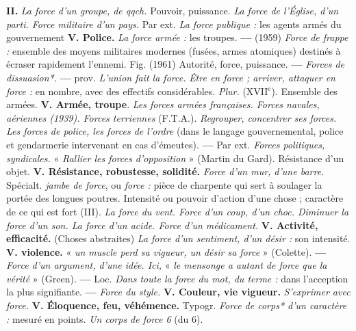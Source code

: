 {\bf II.} {\it La force d'un groupe, de qqch.}  Pouvoir, puissance. {\it La force de l'Église, d'un parti. Force militaire d'un pays.} Par ext. {\it La force publique :} les agents armés du gouvernement {\bf V. Police.} {\it La force armée :} les troupes. {\bf —} (1959) {\it Force de frappe :} ensemble des moyens militaires modernes (fusées, armes atomiques) destinés à écraser rapidement l'ennemi. Fig. (1961) Autorité, force, puissance. {\bf —} {\it Forces de dissuasion*. } {\bf —} {\sc prov.} {\it L'union fait la force.}  {\it Être en force ; arriver, attaquer en force :} en nombre, avec des effectifs considérables.  {\it Plur.} ({\footnotesize XVII}$^\text{e}$). Ensemble des armées. {\bf V. Armée, troupe}. {\it Les forces armées françaises. Forces navales, aériennes (1939). Forces terriennes} (F.T.A.). {\it Regrouper, concentrer ses forces. Les forces de police, les forces de l'ordre} (dans le langage gouvernemental, police et gendarmerie intervenant en cas d'émeutes). {\bf —} Par ext. {\it Forces politiques, syndicales.} « {\it Rallier les forces d'opposition} » ({\sc Martin du Gard}).  Résistance d'un objet. {\bf V. Résistance, robustesse, solidité.} {\it Force d'un mur, d'une barre.} Spécialt. {\it jambe de force}, ou {\it force :} pièce de charpente qui sert à soulager la portée des longues poutres.  Intensité ou pouvoir d'action d'une chose ; caractère de ce qui est fort (III). {\it La force du vent. Force d'un coup, d'un choc. Diminuer la force d'un son. La force d'un acide. Force d'un médicament.} {\bf V. Activité, efficacité.} \lb (Choses abstraites) {\it La force d'un sentiment, d'un désir :} son intensité.  {\bf V. violence.} « {\it un muscle perd sa vigueur, un désir sa force} » ({\sc Colette}). {\bf —} {\it Force d'un argument, d'une idée. Ici,} « {\it le mensonge a autant de force que la vérité} » ({\sc Green}). {\bf —} Loc. {\it Dans toute la force du mot, du terme :} dans l'acception la plus signifiante. {\bf —} {\it Force du style.} {\bf V. Couleur, vie vigueur.} {\it S'exprimer avec force.} {\bf V. Éloquence, feu, véhémence.}  Typogr. {\it Force de corps* d'un caractère :} mesuré en points. {\it Un corps de force 6} (du 6).

